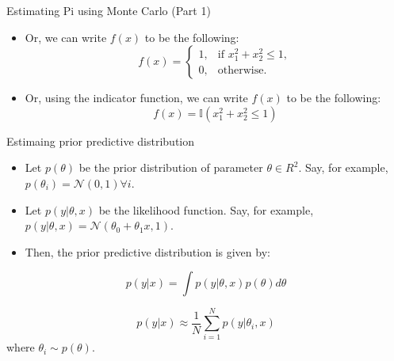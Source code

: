 \documentclass[handout]{beamer}
\begin{document}
\begin{frame}[fragile]{Estimating Pi using Monte Carlo (Part 1)}

    \begin{itemize}
    \item Or, we can write $f(x)$ to be the following:
        \[
        f(x) = \begin{cases}
                    1, & \text{if } x_1^2 + x_2^2 \leq 1, \\
                    0, & \text{otherwise}.
               \end{cases}
        \]
    \item Or, using the indicator function, we can write $f(x)$ to be the following:
        \[
        f(x) = \mathbb{I}(x_1^2 + x_2^2 \leq 1)
        \]
    \end{itemize}
    
    \begin{center}
    \end{center}
    \end{frame}

    \begin{frame}{Estimaing prior predictive distribution}
        \begin{itemize}
            \item Let $p(\theta)$ be the prior distribution of parameter $\theta \in R^2$. Say, for example, $p(\theta_i) = \mathcal{N}(0, 1) \forall i$.
            \item Let $p(y |\theta, x)$ be the likelihood function. Say, for example, $p(y|\theta, x) = \mathcal{N}(\theta_0 + \theta_1 x, 1)$.
            \item Then, the prior predictive distribution is given by:
        \end{itemize}

            \begin{equation}
                p(y|x) = \int p(y|\theta, x) p(\theta) d\theta 
            \end{equation}

            \begin{equation}
                p(y|x) \approx \frac{1}{N} \sum_{i=1}^{N} p(y|\theta_i, x)
            \end{equation}
            where $\theta_i \sim p(\theta)$.
    \end{frame}
    
\end{document}
